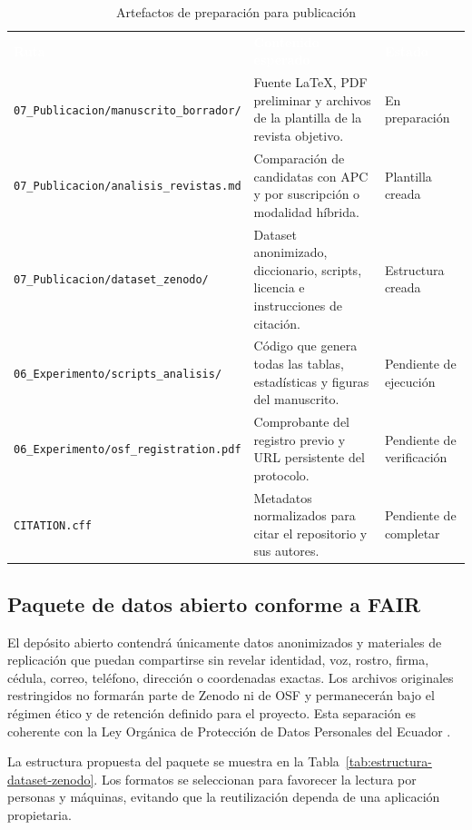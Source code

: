\documentclass[12pt,a4paper]{article}
\begin{document}
\begin{table}[H]
\centering
\caption{Artefactos de preparación para publicación}
\label{tab:artefactos-publicacion}
\small
{}
\begin{tabularx}{\textwidth}{L{4.25cm} Y L{2.55cm}}
\textcolor{white}{\textbf{Ruta}} &
\textcolor{white}{\textbf{Contenido esperado}} &
\textcolor{white}{\textbf{Estado}}\\
\nolinkurl{07_Publicacion/manuscrito_borrador/} & Fuente LaTeX, PDF preliminar y archivos de la plantilla de la revista objetivo. & En preparación\\
\nolinkurl{07_Publicacion/analisis_revistas.md} & Comparación de candidatas con APC y por suscripción o modalidad híbrida. & Plantilla creada\\
\nolinkurl{07_Publicacion/dataset_zenodo/} & Dataset anonimizado, diccionario, scripts, licencia e instrucciones de citación. & Estructura creada\\
\nolinkurl{06_Experimento/scripts_analisis/} & Código que genera todas las tablas, estadísticas y figuras del manuscrito. & Pendiente de ejecución\\
\nolinkurl{06_Experimento/osf_registration.pdf} & Comprobante del registro previo y URL persistente del protocolo. & Pendiente de verificación\\
\nolinkurl{CITATION.cff} & Metadatos normalizados para citar el repositorio y sus autores. & Pendiente de completar\\
\end{tabularx}
\end{table}

\subsection{Paquete de datos abierto conforme a FAIR}

El depósito abierto contendrá únicamente datos anonimizados y materiales de replicación que puedan compartirse sin revelar identidad, voz, rostro, firma, cédula, correo, teléfono, dirección o coordenadas exactas. Los archivos originales restringidos no formarán parte de Zenodo ni de OSF y permanecerán bajo el régimen ético y de retención definido para el proyecto. Esta separación es coherente con la Ley Orgánica de Protección de Datos Personales del Ecuador \cite{lopdp2021}.

La estructura propuesta del paquete se muestra en la Tabla~\ref{tab:estructura-dataset-zenodo}. Los formatos se seleccionan para favorecer la lectura por personas y máquinas, evitando que la reutilización dependa de una aplicación propietaria.
\end{document}

